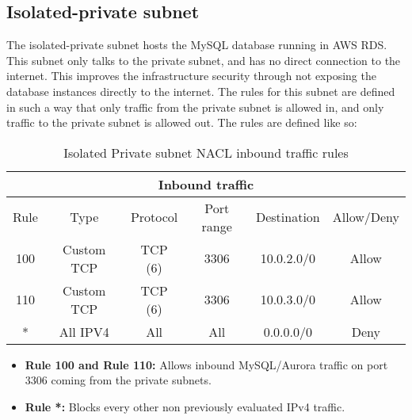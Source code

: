 


\subsection{Isolated-private subnet}
\label{isolated-private-subnet}

The isolated-private subnet hosts the MySQL database running in AWS RDS. This subnet only talks to the private subnet, and has no direct connection to the internet. This improves the infrastructure security through not exposing the database instances directly to the internet. The rules for this subnet are defined in such a way that only traffic from the private subnet is allowed in, and only traffic to the private subnet is allowed out. The rules are defined like so:

\begin{table}[H]
    \centering
    \begin{tabular}{|c|c|c|c|c|c|}
        \hline
        \multicolumn{6}{|c|}{Inbound traffic}                                \\
        \hline
        Rule & Type       & Protocol & Port range & Destination & Allow/Deny \\
        \hline
        100  & Custom TCP & TCP (6)  & 3306       & 10.0.2.0/0  & Allow      \\
        \hline
        110  & Custom TCP & TCP (6)  & 3306       & 10.0.3.0/0  & Allow      \\
        \hline
        *    & All IPV4   & All      & All        & 0.0.0.0/0   & Deny       \\
        \hline
    \end{tabular}
    \caption{Isolated Private subnet NACL inbound traffic rules}
    \label{table:isolated-private-subnet-inbound}
\end{table}

\begin{itemize}
    \item \textbf{Rule 100 and Rule 110:} Allows inbound MySQL/Aurora traffic on port 3306 coming from the private subnets.
    \item \textbf{Rule *:} Blocks every other non previously evaluated IPv4 traffic.
\end{itemize}


